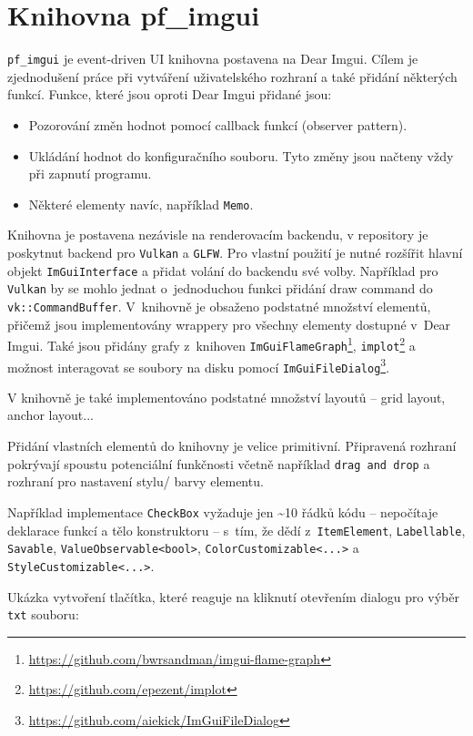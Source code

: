\section{Knihovna pf\_imgui}\label{sec:pf_imgui}
\texttt{pf\_imgui} je event-driven UI knihovna postavena na Dear Imgui. Cílem je zjednodušení práce při vytváření uživatelského rozhraní a také přidání některých funkcí. Funkce, které jsou oproti Dear Imgui přidané jsou:

\begin{itemize}
	\item Pozorování změn hodnot pomocí callback funkcí (observer pattern).
	\item Ukládání hodnot do konfiguračního souboru. Tyto změny jsou načteny vždy při zapnutí programu.
	\item Některé elementy navíc, například \texttt{Memo}.
\end{itemize}

Knihovna je postavena nezávisle na renderovacím backendu, v repository je poskytnut backend pro \texttt{Vulkan} a \texttt{GLFW}. Pro vlastní použití je nutné rozšířit hlavní objekt \texttt{ImGuiInterface} a přidat volání do backendu své volby. Například pro \texttt{Vulkan} by se mohlo jednat o~jednoduchou funkci přidání draw command do \texttt{vk::CommandBuffer}. V~knihovně je obsaženo podstatné množství elementů, přičemž jsou implementovány wrappery pro všechny elementy dostupné v~Dear Imgui. Také jsou přidány grafy z~knihoven \texttt{ImGuiFlameGraph}\footnote{\url{https://github.com/bwrsandman/imgui-flame-graph}}, \texttt{implot}\footnote{\url{https://github.com/epezent/implot}} a možnost interagovat se soubory na disku pomocí \texttt{ImGuiFileDialog}\footnote{\url{https://github.com/aiekick/ImGuiFileDialog}}.

V knihovně je také implementováno podstatné množství layoutů -- grid layout, anchor layout...

Přidání vlastních elementů do knihovny je velice primitivní. Připravená rozhraní pokrývají spoustu potenciální funkčnosti včetně například \texttt{drag and drop} a rozhraní pro nastavení stylu/ barvy elementu. 

Například implementace \texttt{CheckBox} vyžaduje jen \textasciitilde10 řádků kódu -- nepočítaje deklarace funkcí a tělo konstruktoru -- s~tím, že dědí z~\texttt{ItemElement}, \texttt{Labellable}, \texttt{Savable}, \texttt{ValueObservable<bool>}, \texttt{ColorCustomizable<...>} a \texttt{StyleCustomizable<...>}.

Ukázka vytvoření tlačítka, které reaguje na kliknutí otevřením dialogu pro výběr \texttt{txt} souboru:

